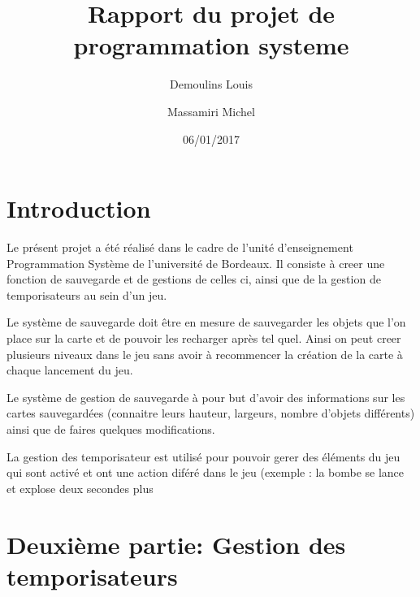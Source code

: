\documentclass{article}
\title{Rapport du projet de programmation systeme}
\date{06/01/2017}
\author{Demoulins Louis \and Massamiri Michel}
\begin{document}
\maketitle


\newpage
\section{Introduction}

Le présent projet a été réalisé dans le cadre de l'unité d'enseignement Programmation Système de l'université de Bordeaux. Il consiste à creer une fonction de sauvegarde et de gestions de celles ci, ainsi que de la gestion de temporisateurs au sein d'un jeu.

Le système de sauvegarde doit être en mesure de sauvegarder les objets que l'on place sur la carte et de pouvoir les recharger après tel quel. Ainsi on peut creer plusieurs niveaux dans le jeu sans avoir à recommencer la création de la carte à chaque lancement du jeu.

Le système de gestion de sauvegarde à pour but d'avoir des informations sur les cartes sauvegardées (connaitre leurs hauteur, largeurs, nombre d'objets différents) ainsi que de faires quelques modifications.

La gestion des temporisateur est utilisé pour pouvoir gerer des éléments du jeu qui sont activé et ont une action diféré dans le jeu (exemple : la bombe se lance et explose deux secondes plus


\newpage
\section{Deuxième partie: Gestion des temporisateurs}
\end{document}
